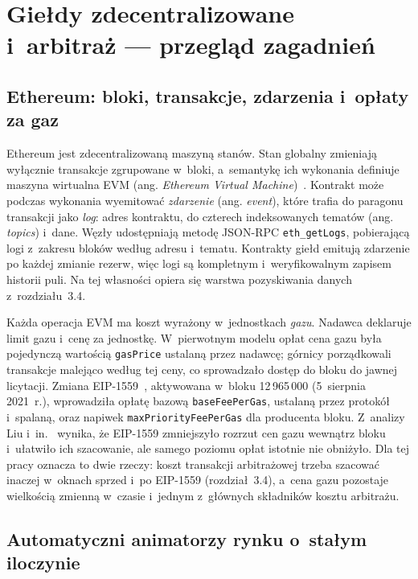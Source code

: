 \newpage
\section{Giełdy zdecentralizowane i~arbitraż --- przegląd zagadnień}

\subsection{Ethereum: bloki, transakcje, zdarzenia i~opłaty za gaz}

Ethereum jest zdecentralizowaną maszyną stanów. Stan globalny zmieniają wyłącznie transakcje
zgrupowane w~bloki, a~semantykę ich wykonania definiuje maszyna wirtualna EVM
(ang. \emph{Ethereum Virtual Machine})~\cite{ethereum_yellowpaper}. Kontrakt może podczas wykonania
wyemitować \emph{zdarzenie} (ang. \emph{event}), które trafia do paragonu transakcji jako
\emph{log}: adres kontraktu, do czterech indeksowanych tematów (ang. \emph{topics}) i~dane.
Węzły udostępniają metodę JSON-RPC \texttt{eth\_getLogs}, pobierającą logi z~zakresu bloków według
adresu i~tematu. Kontrakty giełd emitują zdarzenie po każdej zmianie rezerw, więc logi są
kompletnym i~weryfikowalnym zapisem historii puli. Na tej własności opiera się warstwa
pozyskiwania danych z~rozdziału~3.4.

Każda operacja EVM ma koszt wyrażony w~jednostkach \emph{gazu}. Nadawca deklaruje limit gazu
i~cenę za jednostkę. W~pierwotnym modelu opłat cena gazu była pojedynczą wartością
\texttt{gasPrice} ustalaną przez nadawcę; górnicy porządkowali transakcje malejąco według tej
ceny, co sprowadzało dostęp do bloku do jawnej licytacji. Zmiana EIP-1559~\cite{eip1559},
aktywowana w~bloku 12\,965\,000 (5~sierpnia 2021~r.), wprowadziła opłatę bazową
\texttt{baseFeePerGas}, ustalaną przez protokół i~spalaną, oraz napiwek
\texttt{maxPriorityFeePerGas} dla producenta bloku. Z~analizy Liu i~in.~\cite{liu_eip1559} wynika,
że EIP-1559 zmniejszyło rozrzut cen gazu wewnątrz bloku i~ułatwiło ich szacowanie, ale samego
poziomu opłat istotnie nie obniżyło. Dla tej pracy oznacza to dwie rzeczy: koszt transakcji
arbitrażowej trzeba szacować inaczej w~oknach sprzed i~po EIP-1559 (rozdział~3.4), a~cena gazu
pozostaje wielkością zmienną w~czasie i~jednym z~głównych składników kosztu arbitrażu.

\subsection{Automatyczni animatorzy rynku o~stałym iloczynie}

